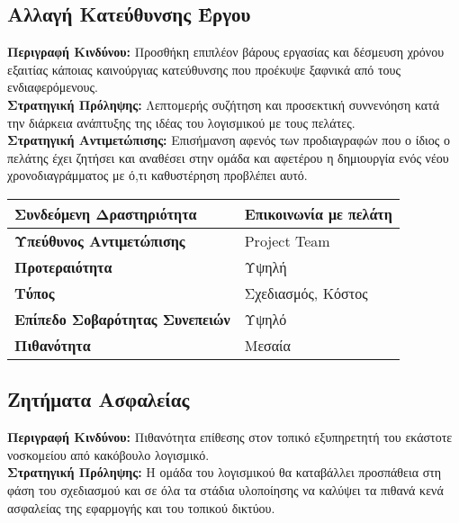 \documentclass{article}
\newcommand\T{\rule{0pt}{2.6ex}}       %
\newcommand\B{\rule[-1.2ex]{0pt}{0pt}}
\begin{document}
   
\subsection{Αλλαγή Κατεύθυνσης Έργου}

\textbf{Περιγραφή Κινδύνου:} Προσθήκη επιπλέον βάρους εργασίας και δέσμευση χρόνου εξαιτίας κάποιας καινούργιας κατεύθυνσης που προέκυψε ξαφνικά από τους ενδιαφερόμενους.\\

\textbf{Στρατηγική Πρόληψης:} Λεπτομερής συζήτηση και προσεκτική συννενόηση κατά την διάρκεια ανάπτυξης της ιδέας του λογισμικού με τους πελάτες.\\


\textbf{Στρατηγική Αντιμετώπισης:} Επισήμανση αφενός των προδιαγραφών που ο ίδιος ο πελάτης έχει ζητήσει και αναθέσει στην ομάδα και αφετέρου η δημιουργία ενός νέου χρονοδιαγράμματος με ό,τι καθυστέρηση προβλέπει αυτό.\\
 
 \begin{center}
     \begin{tabular}{|l|l|}
     \hline
      \textbf{Συνδεόμενη Δραστηριότητα}   & Επικοινωνία με πελάτη \T\B \\ 
      \hline
      \textbf{Υπεύθυνος Αντιμετώπισης} & Project Team \T\B \\
      \hline
      \textbf{Προτεραιότητα} & Υψηλή \T\B \\
      \hline
      \textbf{Τύπος} & Σχεδιασμός, Κόστος \T\B \\
      \hline
      \textbf{Επίπεδο Σοβαρότητας Συνεπειών} & Υψηλό \T\B \\
      \hline
      \textbf{Πιθανότητα} & Μεσαία \T\B \\
      \hline
     \end{tabular}
 \end{center}


\subsection{Ζητήματα Ασφαλείας}

\textbf{Περιγραφή Κινδύνου:} Πιθανότητα επίθεσης στον τοπικό εξυπηρετητή του εκάστοτε νοσκομείου από κακόβουλο λογισμικό.\\

\textbf{Στρατηγική Πρόληψης:} Η ομάδα του λογισμικού θα καταβάλλει προσπάθεια στη φάση του σχεδιασμού και σε όλα τα στάδια υλοποίησης να καλύψει τα πιθανά κενά ασφαλείας της εφαρμογής και του τοπικού δικτύου.\\
\end{document}
